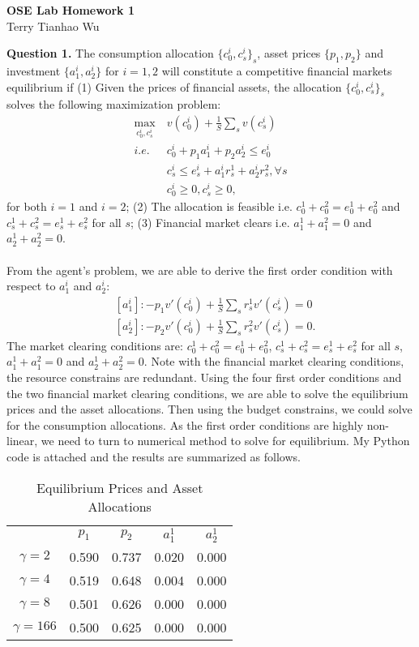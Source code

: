 \documentclass[12pt]{article}
\begin{document}
\begin{center}
\large{\textbf{OSE Lab Homework 1}}
~\\
Terry Tianhao Wu
\end{center}
\begin{spacing}{1.3}
\textbf{Question 1. }The consumption allocation $\{c_0^i,c_s^i\}_{s}$, asset prices $\{p_1,p_2\}$ and investment $\{a_1^i,a_2^i\}$ for $i=1,2$ will constitute a competitive financial markets equilibrium if (1) Given the prices of financial assets, the allocation $\{c_0^i,c_s^i\}_{s}$ solves the following maximization problem:
\begin{align*}
\max_{c_0^i,c_s^i}~&v(c_0^i)+\frac{1}{S}\sum_s v(c_s^i)\\
i.e.~&c_0^i+p_1a_1^i+p_2a_2^i\leq e_0^i\\
~&c_s^i\leq e_s^i+a_1^ir_s^1+a_2^ir_s^2,\forall s\\
~&c_0^i\geq 0, c_s^i \geq 0,
\end{align*}
for both $i=1$ and $i=2$; (2) The allocation is feasible i.e. $c_0^1+c_0^2=e_0^1+e_0^2$ and $c_s^1+c_s^2=e_s^1+e_s^2$ for all $s$; (3) Financial market clears i.e. $a_1^1+a_1^2=0$ and $a_2^1+a_2^2=0$.
~\\~\\
From the agent's problem, we are able to derive the first order condition with respect to $a_1^i$ and $a_2^i$:
\begin{align*}
&[a_1^i]: -p_1 v'(c_0^i)+\frac{1}{S}\sum_s r_s^1v'(c_s^i)=0\\
&[a_2^i]: -p_2 v'(c_0^i)+\frac{1}{S}\sum_s r_s^2v'(c_s^i)=0.
\end{align*}
The market clearing conditions are: $c_0^1+c_0^2=e_0^1+e_0^2$, $c_s^1+c_s^2=e_s^1+e_s^2$ for all $s$, $a_1^1+a_1^2=0$ and $a_2^1+a_2^2=0$. Note with the financial market clearing conditions, the resource constrains are redundant. Using the four first order conditions and the two financial market clearing conditions, we are able to solve the equilibrium prices and the asset allocations. Then using the budget constrains, we could solve for the consumption allocations. As the first order conditions are highly non-linear, we need to turn to numerical method to solve for equilibrium. My Python code is attached and the results are summarized as follows.
\begin{table}[H] 
	\centering 
	\begin{tabular}{ccccc} 
		\hline
		&$p_1 $ &$p_2$ & $a_1^1$ & $a_2^1$ \\
		$\gamma=2$ 	&0.590  &0.737 & 0.020 & 0.000 \\
		$\gamma=4$ 	&0.519 &0.648 & 0.004 & 0.000\\
		$\gamma=8$  	&0.501 &0.626&0.000& 0.000 \\
		$\gamma=166$ 	&0.500  &0.625 & 0.000&0.000\\
		\hline
	\end{tabular} 
\caption{Equilibrium Prices and Asset Allocations}
\end{table}


\end{spacing}
\end{document}

